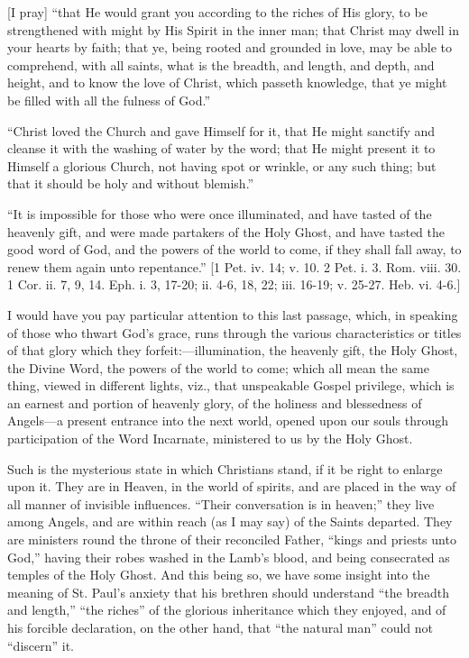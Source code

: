 [I pray] ``that He would grant you according to the riches of
His glory, to be strengthened with might by His Spirit in the inner
man; that Christ may dwell in your hearts by faith; that ye, being
rooted and grounded in love, may be able to comprehend, with all
saints, what is the breadth, and length, and depth, and height, and to
know the love of Christ, which passeth knowledge, that ye might be
filled with all the fulness of God.''

``Christ loved the Church and gave Himself for it, that He
might sanctify and cleanse it with the washing of water by the word;
that He might present it to Himself a glorious Church, not having spot
or wrinkle, or any such thing; but that it should be holy and without
blemish.''

``It is impossible for those who were once illuminated, and
have tasted of the heavenly gift, and were made partakers of the Holy
Ghost, and have tasted the good word of God, and the powers of the
world to come, if they shall fall away, to renew them again unto
repentance.'' [1 Pet. iv. 14; v. 10. 2 Pet. i. 3. Rom. viii. 30. 1
Cor. ii. 7, 9, 14. Eph. i. 3, 17-20; ii. 4-6, 18, 22; iii. 16-19; v.
25-27. Heb. vi. 4-6.]

I would have you pay particular attention to this last passage,
which, in speaking of those who thwart God's grace, runs through the
various characteristics or titles of that glory which they forfeit:—illumination,
the heavenly gift, the Holy Ghost, the Divine Word, the powers of the
world to come; which all mean the same thing, viewed in different
lights, viz., that unspeakable Gospel privilege, which is an earnest
and portion of heavenly glory, of the holiness and blessedness of
Angels—a present entrance into the next world, opened upon our souls
through participation of the Word Incarnate, ministered to us by the
Holy Ghost.

Such is the mysterious state in which Christians stand, if it be
right to enlarge upon it. They are in Heaven, in the world of spirits,
and are placed in the way of all manner of invisible influences.
``Their conversation is in heaven;'' they live among Angels,
and are within reach (as I may say) of the Saints departed. They are
ministers round the throne of their reconciled Father, ``kings and
priests unto God,'' having their robes washed in the Lamb's
blood, and being consecrated as temples of the Holy Ghost. And this
being so, we have some insight into the meaning of St. Paul's
anxiety that his brethren should understand ``the breadth and
length,'' ``the riches'' of the glorious inheritance which
they enjoyed, and of his forcible declaration, on the other hand, that
``the natural man'' could not ``discern'' it.

